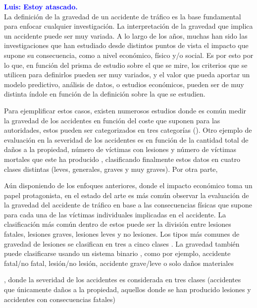 \documentclass{uathesis-es}
\begin{document}
\textcolor{blue}{\textbf{Luis: Estoy atascado.}}\\


La definición de la gravedad de un accidente de tráfico es la base fundamental para enfocar cualquier investigación. La interpretación de la gravedad que implica un accidente puede ser muy variada. A lo largo de los años, muchas han sido las investigaciones que han estudiado desde distintos puntos de vista el impacto que supone su consecuencia, como a nivel económico, físico y/o social. Es por esto por lo que, en función del prisma de estudio sobre el que se mire, los criterios que se utilicen para definirlos pueden ser muy variados, y el valor que pueda aportar un modelo predictivo, análisis de datos, o estudios económicos, pueden ser de muy distinta índole en función de la definición sobre la que se estudien.

Para ejemplificar estos casos, existen numerosos estudios donde es común medir la gravedad de los accidentes en función del coste que suponen para las autoridades, estos pueden ser categorizados en tres categorías (). Otro ejemplo de evaluación en la severidad de los accidentes es en función de la cantidad total de daños a la propiedad, número de víctimas con lesiones y número de víctimas mortales que este ha producido \cite{Yang2023}, clasificando finalmente estos datos en cuatro clases distintas (leves, generales, graves y muy graves). Por otra parte, 

Aún disponiendo de los enfoques anteriores, donde el impacto económico toma un papel protagonista, en el estado del arte es más común observar la evaluación de la gravedad del accidente de tráfico en base a las consecuencias físicas que supone para cada una de las víctimas individuales implicadas en el accidente. La clasificación más común dentro de estos puede ser la división entre lesiones fatales, lesiones graves, lesiones leves y no lesiones. Los tipos más comunes de gravedad de lesiones se clasifican en tres a cinco clases \cite{hosseinzadeh2021investigating,panicker2022injury}. La gravedad también puede clasificarse usando un sistema binario \cite{prati2017using}, como por ejemplo, accidente fatal/no fatal, lesión/no lesión, accidente grave/leve o solo daños materiales \cite{zhang2022hybrid,ma2021analytic}


\cite{app7060476}, donde la severidad de los accidentes es considerada en tres clases (accidentes que únicamente daños a la propiedad, aquellos donde se han producido lesiones y accidentes con consecuencias fatales)
\end{document}
